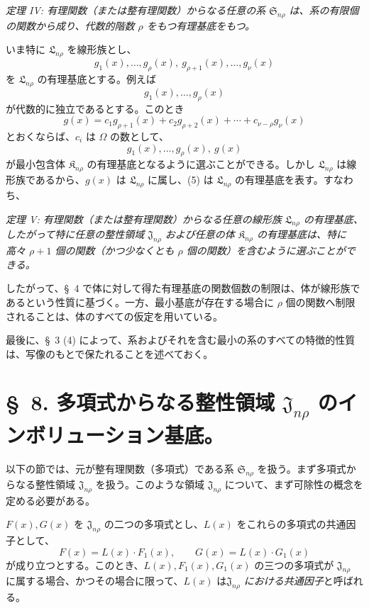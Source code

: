 \documentclass[11pt]{jlreq}
\providecommand{\Kfield}{\mathfrak{K}}
\providecommand{\Ssys}{\mathfrak{S}}
\providecommand{\Lsys}{\mathfrak{L}}
\providecommand{\Jdom}{\mathfrak{J}}
\begin{document}
\emph{定理 IV: 有理関数（または整有理関数）からなる任意の系 $\Ssys_{n\rho}$ は、系の有限個の関数から成り、代数的階数 $\rho$ をもつ有理基底をもつ。}

いま特に $\Lsys_{n\rho}$ を線形族とし、
\begin{equation}
  g_1(x),\ldots,g_\rho(x),\ g_{\rho+1}(x),\ldots,g_\nu(x)
\tag{4}
\end{equation}
を $\Lsys_{n\rho}$ の有理基底とする。例えば
\[
  g_1(x),\ldots,g_\rho(x)
\]
が代数的に独立であるとする。このとき
\[
  g(x)=c_1g_{\rho+1}(x)+c_2g_{\rho+2}(x)+\cdots+c_{\nu-\rho}g_\nu(x)
\]
とおくならば、$c_i$ は $\Omega$ の数として、
\begin{equation}
  g_1(x),\ldots,g_\rho(x),\ g(x)
\tag{5}
\end{equation}
が最小包含体 $\Kfield_{n\rho}$ の有理基底となるように選ぶことができる。しかし $\Lsys_{n\rho}$ は線形族であるから、$g(x)$ は $\Lsys_{n\rho}$ に属し、(5) は $\Lsys_{n\rho}$ の有理基底を表す。すなわち、

\emph{定理 V: 有理関数（または整有理関数）からなる任意の線形族 $\Lsys_{n\rho}$ の有理基底、したがって特に任意の整性領域 $\Jdom_{n\rho}$ および任意の体 $\Kfield_{n\rho}$ の有理基底は、特に高々 $\rho+1$ 個の関数（かつ少なくとも $\rho$ 個の関数）を含むように選ぶことができる。}

したがって、\S\ 4 で体に対して得た有理基底の関数個数の制限は、体が線形族であるという性質に基づく。一方、最小基底が存在する場合に $\rho$ 個の関数へ制限されることは、体のすべての仮定を用いている。

最後に、\S\ 3 (4) によって、系およびそれを含む最小の系のすべての特徴的性質は、写像のもとで保たれることを述べておく。

\section*{\S\ 8. 多項式からなる整性領域 $\Jdom_{n\rho}$ のインボリューション基底。}

以下の節では、元が整有理関数（多項式）である系 $\Ssys_{n\rho}$ を扱う。まず多項式からなる整性領域 $\Jdom_{n\rho}$ を扱う。このような領域 $\Jdom_{n\rho}$ について、まず可除性の概念を定める必要がある。

$F(x),G(x)$ を $\Jdom_{n\rho}$ の二つの多項式とし、$L(x)$ をこれらの多項式の共通因子として、
\[
  F(x)=L(x)\cdot F_1(x),\qquad G(x)=L(x)\cdot G_1(x)
\]
が成り立つとする。このとき、$L(x),F_1(x),G_1(x)$ の三つの多項式が $\Jdom_{n\rho}$ に属する場合、かつその場合に限って、$L(x)$ は\emph{$\Jdom_{n\rho}$ における共通因子}と呼ばれる。
\end{document}
